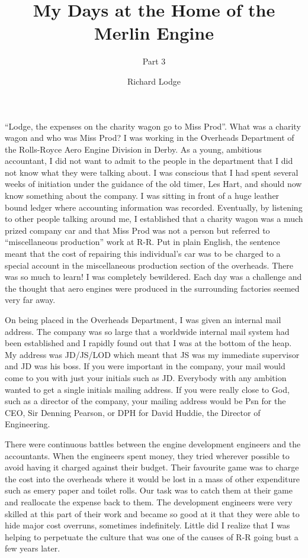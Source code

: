 %


\title{My Days at the Home of the Merlin Engine}
\subtitle{Part 3}
\author{Richard Lodge}

\maketitle

``Lodge, the expenses on the charity wagon go to Miss Prod''. What was a
charity wagon and who was Miss Prod? I was working in the Overheads
Department of the Rolls-Royce Aero Engine Division in Derby. As a
young, ambitious accountant, I did not want to admit to the people in
the department that I did not know what they were talking about. I was
conscious that I had spent several weeks of initiation under the
guidance of the old timer, Les Hart, and should now know something
about the company. I was sitting in front of a huge leather bound
ledger where accounting information was recorded. Eventually, by
listening to other people talking around me, I established that a
charity wagon was a much prized company car and that Miss Prod was not
a person but referred to ``miscellaneous production'' work at R-R. Put
in plain English, the sentence meant that the cost of repairing this
individual's car was to be charged to a special account in the
miscellaneous production section of the overheads. There was so much
to learn!  I was completely bewildered. Each day was a challenge and
the thought that aero engines were produced in the surrounding
factories seemed very far away.

On being placed in the Overheads Department, I was given an internal
mail address. The company was so large that a worldwide internal mail
system had been established and I rapidly found out that I was at the
bottom of the heap. My address was JD/JS/LOD which meant that JS was
my immediate supervisor and JD was his boss. If you were important in
the company, your mail would come to you with just your initials such
as JD. Everybody with any ambition wanted to get a single initials
mailing address. If you were really close to God, such as a director
of the company, your mailing address would be Psn for the CEO, Sir
Denning Pearson, or DPH for David Huddie, the Director of Engineering.

There were continuous battles between the engine development engineers
and the accountants. When the engineers spent money, they tried
wherever possible to avoid having it charged against their
budget. Their favourite game was to charge the cost into the overheads
where it would be lost in a mass of other expenditure such as emery
paper and toilet rolls. Our task was to catch them at their game and
reallocate the expense back to them. The development engineers were
very skilled at this part of their work and became so good at it that
they were able to hide major cost overruns, sometimes
indefinitely. Little did I realize that I was helping to perpetuate
the culture that was one of the causes of R-R going bust a few years
later.

